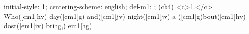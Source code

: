initial-style: 1;
centering-scheme: english;
def-m1: \grealign;
(cb4) <c>1.</c> Who([em1]hv) day([em1]g) and([em1]jv) night([em1]jv) a-([em1]g)bout([em1]hv) dost([em1]iv) bring,([em1]hg)